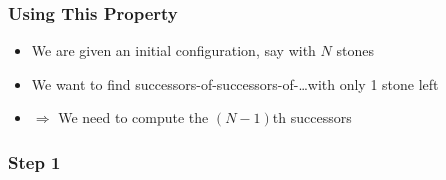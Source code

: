 \documentclass{beamer}
\begin{document}
\begin{frame}
  \frametitle{Using This Property}
  \begin{itemize}
    \item We are given an initial configuration, say with $N$ stones
    \item We want to find successors-of-successors-of-\dots with only 1 stone left
    \item $\Rightarrow$ We need to compute the $(N-1)$th successors
  \end{itemize}
  \begin{center}
    \begin{minipage}{.9\linewidth}
      
    \end{minipage}
  \end{center}
\end{frame}

\begin{frame}
  \frametitle{Step 1}
  \begin{itemize}

  \end{itemize}
\end{frame}
\end{document}
